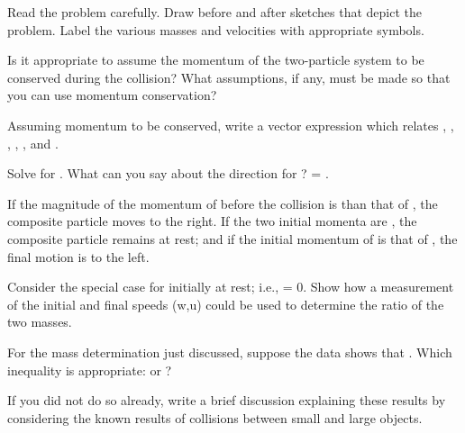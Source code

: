 {{\begin{one-digit-list}
\item [1.] Read the problem carefully.
           Draw before and after sketches that depict the problem.
           Label the various masses and velocities with appropriate symbols. 

\item [2.] Is it appropriate to assume the momentum of the two-particle system
           to be conserved during the collision?
           What assumptions, if any, must be made so that you can use momentum
           conservation? 

\item [3.] Assuming momentum to be conserved, write a vector expression which
           relates , , , , , and . 

\item [4.] Solve for .
           What can you say about the direction for ?
            = \OneInchAnswer . 

\item [5.] If the magnitude of the momentum of  before the collision is \OneInchAnswer
           than that of , the composite particle moves to the right.
           If the two initial momenta are \OneInchAnswer, the composite particle remains
           at rest; and if the initial momentum of  is \OneInchAnswer that of , the
           final motion is to the left. 

\item [6.] Consider the special case for  initially at rest; i.e.,  = 0.
           Show how a measurement of the initial and final speeds (w,u) could
           be used to determine the ratio of the two masses. 

\item [7.] For the mass determination just discussed, suppose the data shows
           that .
           Which inequality is appropriate:  or ? 

\item [8.] If you did not do so already, write a brief discussion explaining
           these results by considering the known results of collisions
           between small and large objects. 
\end{one-digit-list}

\newline
{}

}}
